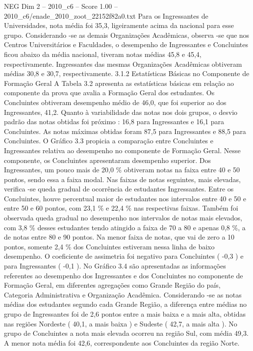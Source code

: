 \begin{textsample}{NEG Dim 2 – 2010\_c6 – Score 1.00 – 2010\_c6/enade\_2010\_zoot\_22152f82a0.txt}
Para os Ingressantes de Universidades, nota média foi 35,3, ligeiramente acima da nacional para esse grupo.
Considerando -se as demais Organizações Acadêmicas, observa -se que nos Centros Universitários e Faculdades, o desempenho de Ingressantes e Concluintes ficou abaixo da média nacional, tiveram notas médias 45,8 e 45,4, respectivamente.
Ingressantes das mesmas Organizações Acadêmicas obtiveram médias 30,8 e 30,7, respectivamente. 3.1.2 Estatísticas Básicas no Componente de Formação Geral A Tabela 3.2 apresenta as estatísticas básicas em relação ao componente da prova que avalia a Formação Geral dos estudantes.
Os Concluintes obtiveram desempenho médio de 46,0, que foi superior ao dos Ingressantes, 41,2.
Quanto à variabilidade das notas nos dois grupos, o desvio padrão das notas obtidas foi próximo : 16,8 para Ingressantes e 16,1 para Concluintes.
As notas máximas obtidas foram 87,5 para Ingressantes e 88,5 para Concluintes.
O Gráfico 3.3 propicia a comparação entre Concluintes e Ingressantes relativa ao desempenho no componente de Formação Geral.
Nesse componente, os Concluintes apresentaram desempenho superior.
Dos Ingressantes, um pouco mais de 20,0 \% obtiveram notas na faixa entre 40 e 50 pontos, sendo essa a faixa modal.
Nas faixas de notas seguintes, mais elevadas, verifica -se queda gradual de ocorrência de estudantes Ingressantes.
Entre os Concluintes, houve percentual maior de estudantes nos intervalos entre 40 e 50 e entre 50 e 60 pontos, com 23,1 \% e 22,4 \% nas respectivas faixas.
Também foi observada queda gradual no desempenho nos intervalos de notas mais elevados, com 3,8 \% desses estudantes tendo atingido a faixa de 70 a 80 e apenas 0,8 \%, a de notas entre 80 e 90 pontos.
Na menor faixa de notas, que vai de zero a 10 pontos, somente 2,4 \% dos Concluintes estiveram nessa linha de baixo desempenho.
O coeficiente de assimetria foi negativo para Concluintes ( -0,3 ) e para Ingressantes ( -0,1 ).
No Gráfico 3.4 são apresentadas as informações referentes ao desempenho dos Ingressantes e dos Concluintes no componente de Formação Geral, em diferentes agregações como Grande Região do país, Categoria Administrativa e Organização Acadêmica.
Considerando -se as notas médias dos estudantes segundo cada Grande Região, a diferença entre médias no grupo de Ingressantes foi de 2,6 pontos entre a mais baixa e a mais alta, obtidas nas regiões Nordeste ( 40,1, a mais baixa ) e Sudeste ( 42,7, a mais alta ).
No grupo de Concluintes a nota mais elevada ocorreu na região Sul, com média 49,3.
A menor nota média foi 42,6, correspondente aos Concluintes da região Norte.

\end{textsample}
